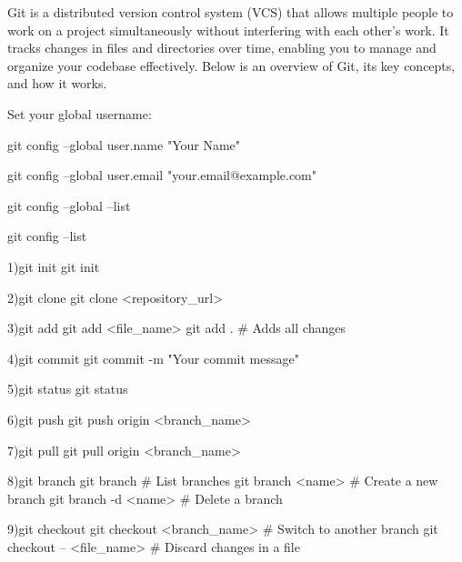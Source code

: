 Git is a distributed version control system (VCS) that allows multiple people to work on a project 
simultaneously without interfering with each other's work. 
It tracks changes in files and directories over time,
enabling you to manage and organize your codebase effectively. Below is an overview of Git, its key concepts, and how it works.

Set your global username:

git config --global user.name "Your Name"


git config --global user.email "your.email@example.com"

git config --global --list

git config --list


1)git init
git init

2)git clone
git clone <repository_url>

3)git add
git add <file_name>
git add .   # Adds all changes

4)git commit
git commit -m "Your commit message"

5)git status
git status

6)git push
git push origin <branch_name>

7)git pull
git pull origin <branch_name>


8)git branch
git branch          # List branches
git branch <name>   # Create a new branch
git branch -d <name>  # Delete a branch

9)git checkout
git checkout <branch_name>  # Switch to another branch
git checkout -- <file_name>  # Discard changes in a file


